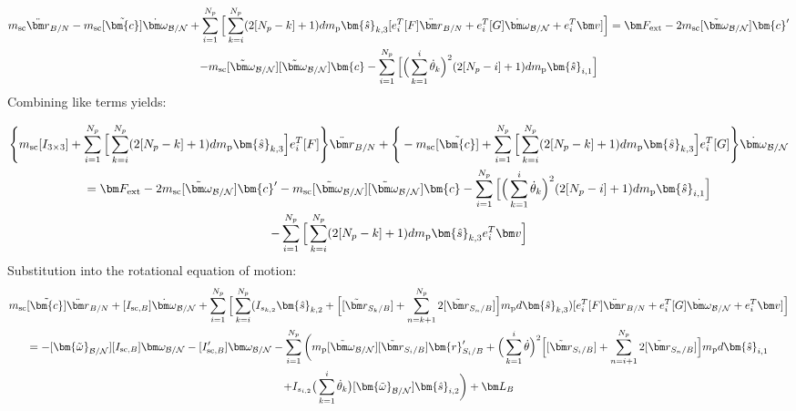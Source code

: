 \documentclass[paper]{aiaaNew}
\begin{document}
\begin{multline}
m_{\textnormal{sc}} \ddot{\bm r}_{B/N}-m_{\textnormal{sc}} [\tilde{\bm{c}}]\dot{\bm\omega}_{\cal B/N}+\sum^{N_p}_{i=1} \Big[ \sum^{N_p}_{k=i} (2[N_p-k]+1) d m_{\text{p}} \bm{\hat{s}}_{k,3} [e_{i}^T[F] \ddot{\bm r}_{B/N} + e_{i}^T[G]\dot{\bm\omega}_{\cal B/N} + e_{i}^T\bm v] \Big] = \bm F_{\textnormal{ext}} - 2 m_{\textnormal{sc}} [\tilde{\bm\omega}_{\cal B/N}]\bm{c}'\\
- m_{\textnormal{sc}} [\tilde{\bm\omega}_{\cal B/N}][\tilde{\bm\omega}_{\cal B/N}]\bm{c}-\sum^{N_p}_{i=1} \Big[ \Big(\sum^{i}_{k=1}\dot{\theta}_k\Big)^2 (2[N_p-i]+1) d m_{\text{p}} \bm{\hat{s}}_{i,1} \Big]
\label{eq:Rbddot5}
\end{multline}
Combining like terms yields:

\begin{multline}
\Bigg \lbrace m_{\textnormal{sc}}[I_{3\times 3}] + \sum^{N_p}_{i=1} \Big[\sum^{N_p}_{k=i} (2[N_p-k]+1) d m_{\text{p}} \bm{\hat{s}}_{k,3}\Big] e_{i}^T[F] \Bigg \rbrace \ddot{\bm r}_{B/N} 
+ \Bigg \lbrace -m_{\textnormal{sc}} [\tilde{\bm{c}}]  + \sum^{N_p}_{i=1} \Big[\sum^{N_p}_{k=i} (2[N_p-k]+1) d m_{\text{p}} \bm{\hat{s}}_{k,3}\Big] e_{i}^T[G]\Bigg \rbrace \dot{\bm\omega}_{\cal B/N}\\
=  \bm F_{\textnormal{ext}} - 2 m_{\textnormal{sc}} [\tilde{\bm\omega}_{\cal B/N}]\bm{c}'
- m_{\textnormal{sc}} [\tilde{\bm\omega}_{\cal B/N}][\tilde{\bm\omega}_{\cal B/N}]\bm{c}-\sum^{N_p}_{i=1} \Big[ \Big(\sum^{i}_{k=1}\dot{\theta}_k\Big)^2 (2[N_p-i]+1) d m_{\text{p}} \bm{\hat{s}}_{i,1} \Big]\\
- \sum^{N_p}_{i=1} \Big[\sum^{N_p}_{k=i} (2[N_p-k]+1) d m_{\text{p}} \bm{\hat{s}}_{k,3} e_{i}^T \bm v \Big]
\label{eq:Rbddot6}
\end{multline}
Substitution into the rotational equation of motion:
\begin{multline}
m_{\text{sc}}[\tilde{\bm{c}}]\ddot{\bm r}_{B/N} + [I_{\text{sc},B}] \dot{\bm\omega}_{\cal B/N} + \sum\limits_{i=1}^{N_p} \Big[ \sum^{N_p}_{k=i} (I_{s_{k,2}} \bm{\hat{s}}_{k,2} + \Big[ [\tilde{{\bm r}}_{S_{k}/B}] + \sum\limits_{n=k+1}^{N_p}2[\tilde{{\bm r}}_{S_{n}/B}]\Big]m_{\text{p}} d \bm{\hat{s}}_{k,3} ) [e_{i}^T[F] \ddot{\bm r}_{B/N} + e_{i}^T[G]\dot{\bm\omega}_{\cal B/N} + e_{i}^T\bm v]\Big]\\
= -[\bm{\tilde{\omega}}_{\cal B/N}] [I_{\text{sc},B}] \bm\omega_{\cal B/N} - [I'_{\text{sc},B}] \bm\omega_{\cal B/N} - \sum\limits_{i=1}^{N_p}\bigg( m_{\text{p}} [\tilde{\bm\omega}_{\cal B/N}] [\tilde{{\bm r}}_{S_{i}/B}] \bm{r}'_{S_i/B} + \Big( \sum\limits_{k=1}^{i} \dot{\theta}\Big)^2 \Big[[\tilde{{\bm r}}_{S_{i}/B}] + \sum\limits_{n=i+1}^{N_p}2[\tilde{{\bm r}}_{S_{n}/B}]\Big] m_{\text{p}} d \bm{\hat{s}}_{i,1}\\
+ I_{s_{i,2}} \big(\sum^{i}_{k=1}\dot{\theta}_k\big) [\bm{\tilde{\omega}}_{\cal B/N}] \bm{\hat{s}}_{i,2} \bigg) + \bm L_B
\label{eq:Final7sub}
\end{multline}
\end{document}
